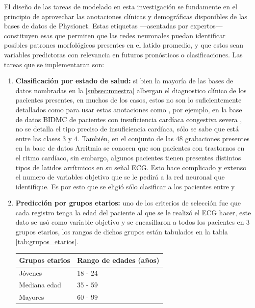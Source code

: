 \documentclass[12pt,letterpaper,oneside,openright]{book}
\begin{document}
El diseño de las tareas de modelado en esta investigación se fundamente en el principio de aprovechar las anotaciones clínicas y demográficas disponibles de las bases de datos de Physionet. Estas etiquetas ---asentadas por expertos--- constituyen esas  que permiten que las redes neuronales puedan identificar posibles patrones morfológicos presentes en el latido promedio, y que estos sean variables predictoras con relevancia en futuros pronósticos o clasificaciones. Las tareas que se implementaran son:
\begin{enumerate}
	\item \textbf{Clasificación por estado de salud:} si bien la mayoría de las bases de datos nombradas en la \ref{subsec:muestra} albergan el diagnostico clínico de los pacientes presentes, en muchos de los casos, estos no son lo suficientemente detallados como para usar estas anotaciones como , por ejemplo, en la base de datos BIDMC de pacientes con insuficiencia cardíaca congestiva severa \cite{InsuficienciaCardiacaDB}, no se detalla el tipo preciso de insuficiencia cardíaca, sólo se sabe que está entre las clases 3 y 4. También, en el conjunto de las 48 grabaciones presentes en la base de datos Arritmia \cite{arritmiadb} se conocen que son pacientes con trastornos en el ritmo cardíaco, sin embargo, algunos pacientes tienen presentes distintos tipos de latidos arrítmicos en su señal ECG. Esto hace complicado y extenso el numero de variables objetivo que se le pedirá a la red neuronal que identifique. Es por esto que se eligió sólo clasificar a los pacientes entre  y 
	\item \textbf{Predicción por grupos etarios:} uno de los criterios de selección fue que cada registro tenga la edad del paciente al que se le realizó el ECG hacer, este dato se usó como variable objetivo y se encasillaron a todos los pacientes en 3 grupos etarios, los rangos de dichos grupos están tabulados en la tabla \ref{tab:grupos_etarios}.
	\begin{table}[h]
		\begin{center}
			\begin{tabular}{| M{3cm} | M{2cm} |}
				\hline
				\textbf{Grupos etarios} & \textbf{Rango de edades (años)} \\ \hline
				Jóvenes & 18 - 24 \\ \hline
				Mediana edad & 35 - 59 \\ \hline
				Mayores & 60 - 99 \\ \hline

\end{tabular}
\end{center}
\end{table}
\end{enumerate}
\end{document}

